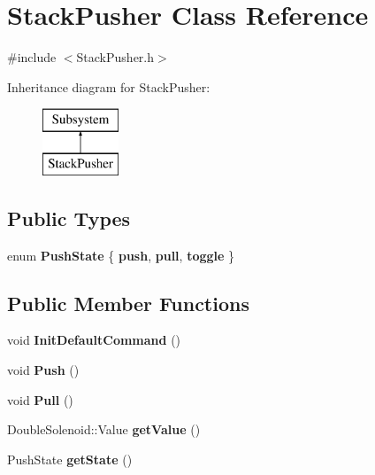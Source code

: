 \hypertarget{class_stack_pusher}{}\section{Stack\+Pusher Class Reference}
\label{class_stack_pusher}


{\ttfamily \#include $<$Stack\+Pusher.\+h$>$}

Inheritance diagram for Stack\+Pusher\+:\begin{figure}[H]
\begin{center}
\leavevmode
\includegraphics[height=2.000000cm]{class_stack_pusher}
\end{center}
\end{figure}
\subsection*{Public Types}
\begin{DoxyCompactItemize}
\item 
\hypertarget{class_stack_pusher_a0ceaed23d26945569ce1ba0f7a0ac03c}{}enum {\bfseries Push\+State} \{ {\bfseries push}, 
{\bfseries pull}, 
{\bfseries toggle}
 \}\label{class_stack_pusher_a0ceaed23d26945569ce1ba0f7a0ac03c}

\end{DoxyCompactItemize}
\subsection*{Public Member Functions}
\begin{DoxyCompactItemize}
\item 
\hypertarget{class_stack_pusher_ab417d768ab7a62abb345f90f430db33b}{}void {\bfseries Init\+Default\+Command} ()\label{class_stack_pusher_ab417d768ab7a62abb345f90f430db33b}

\item 
\hypertarget{class_stack_pusher_a4483faf60977aee62e81fec2633cd235}{}void {\bfseries Push} ()\label{class_stack_pusher_a4483faf60977aee62e81fec2633cd235}

\item 
\hypertarget{class_stack_pusher_aaf80b44d7b297119070fc5ebd200f66e}{}void {\bfseries Pull} ()\label{class_stack_pusher_aaf80b44d7b297119070fc5ebd200f66e}

\item 
\hypertarget{class_stack_pusher_a282863dc7c3e1cc8d22f5d2fa7e13a05}{}Double\+Solenoid\+::\+Value {\bfseries get\+Value} ()\label{class_stack_pusher_a282863dc7c3e1cc8d22f5d2fa7e13a05}

\item 
\hypertarget{class_stack_pusher_a2d85e99821ac24d1a465048ccf07d974}{}Push\+State {\bfseries get\+State} ()\label{class_stack_pusher_a2d85e99821ac24d1a465048ccf07d974}

\end{DoxyCompactItemize}


